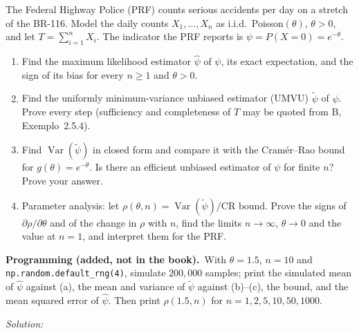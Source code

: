 \documentclass[11pt,a4paper]{article}
\newif\ifsolucoes
\newcommand{\espacoresol}{4.5cm}   %
\numberwithin{equation}{questao}   %
\newcommand{\programacao}{\par\smallskip\noindent\textbf{Programming (added, not in the book).}~}
\newcommand{\resolespaco}{\ifsolucoes\else\par\textit{Solution:}\vspace{\espacoresol}\par\fi}
\newcommand{\Var}{\operatorname{Var}}
\newcommand{\1}{\mathbf{1}}
\begin{document}
The Federal Highway Police (PRF) counts serious accidents per day on a stretch of the BR-116. Model
the daily counts $X_1,\dots,X_n$ as i.i.d.\ Poisson$(\theta)$, $\theta>0$, and let
$T=\sum_{i=1}^nX_i$. The indicator the PRF reports is $\psi=P(X=0)=e^{-\theta}$.
\begin{enumerate}[label=\textbf{(\alph*)},leftmargin=2.4em]
\item Find the maximum likelihood estimator $\hat\psi$ of $\psi$, its exact expectation, and the sign
of its bias for every $n\ge1$ and $\theta>0$.
\item Find the uniformly minimum-variance unbiased estimator (UMVU) $\tilde\psi$ of $\psi$. Prove
every step (sufficiency and completeness of $T$ may be quoted from B, Exemplo~2.5.4).
\item Find $\Var(\tilde\psi)$ in closed form and compare it with the Cramér--Rao bound for
$g(\theta)=e^{-\theta}$. Is there an efficient unbiased estimator of $\psi$ for finite $n$? Prove your
answer.
\item Parameter analysis: let $\rho(\theta,n)=\Var(\tilde\psi)/\text{CR bound}$. Prove the signs of
$\partial\rho/\partial\theta$ and of the change in $\rho$ with $n$, find the limits $n\to\infty$,
$\theta\to0$ and the value at $n=1$, and interpret them for the PRF.
\end{enumerate}
\programacao With $\theta=1.5$, $n=10$ and \texttt{np.random.default\_rng(4)}, simulate
$200{,}000$ samples; print the simulated mean of $\hat\psi$ against (a), the mean and variance of
$\tilde\psi$ against (b)--(c), the bound, and the mean squared error of $\hat\psi$. Then print
$\rho(1.5,n)$ for $n=1,2,5,10,50,1000$.
\resolespaco
\end{document}
